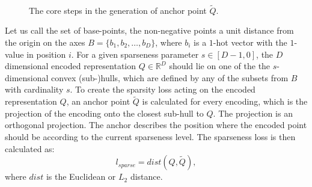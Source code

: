 			\begin{figure}[ht]
				\centering
				\\				
				\caption[Anchor point generation in SCA]{The core steps in the generation of anchor point $\widetilde{Q}$.}
				\label{fig:core}
			\end{figure}
			
			Let us call the set of base-points, the non-negative points a unit distance from the origin on the axes $B = \{b_1, b_2, \dots, b_D\}$, where $b_i$ is a $1$-hot vector with the $1$-value in position $i$.
			For a given sparseness parameter $s \in [D-1, 0]$, the $D$ dimensional encoded representation $Q \in \mathbb{R}^D$ should lie on one of the the $s$-dimensional convex (sub-)hulls, which are defined by any of the subsets from $B$ with cardinality $s$.
			To create the sparsity loss acting on the encoded representation $Q$, an anchor point $\widetilde{Q}$ is calculated for every encoding, which is the projection of the encoding onto the closest sub-hull to $Q$.
			The projection is an orthogonal projection.
			The anchor describes the position where the encoded point should be according to the current sparseness level.
			The sparseness loss is then calculated as:
			\begin{equation}
				l_{sparse} = dist(Q, \widetilde{Q}),
			\end{equation}
			\noindent where $dist$ is the Euclidean or $L_2$ distance.
			
